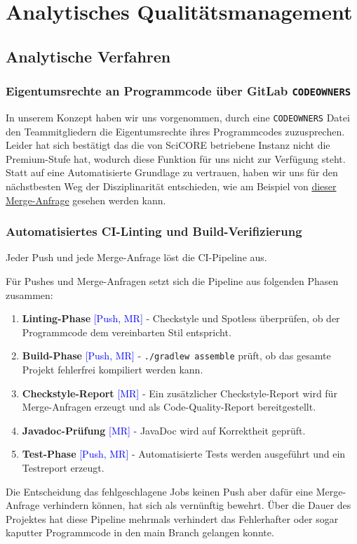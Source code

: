 \documentclass{article}
\begin{document}
\newpage
\section{Analytisches Qualitätsmanagement}

\subsection{Analytische Verfahren}

\subsubsection{Eigentumsrechte an Programmcode über GitLab \texttt{CODEOWNERS}}
In unserem Konzept haben wir uns vorgenommen, durch eine \texttt{CODEOWNERS} Datei den Teammitgliedern die Eigentumsrechte ihres Programmcodes zuzusprechen. Leider hat sich bestätigt das die von SciCORE betriebene Instanz nicht die Premium-Stufe hat, wodurch diese Funktion für uns nicht zur Verfügung steht. \\

Statt auf eine Automatisierte Grundlage zu vertrauen, haben wir uns für den nächstbesten Weg der Disziplinarität entschieden, wie am Beispiel von \href{https://git.scicore.unibas.ch/cs108-fs26/Gruppe-13/-/merge_requests/166}{dieser Merge-Anfrage} gesehen werden kann.

\subsubsection{Automatisiertes CI-Linting und Build-Verifizierung}
Jeder Push und jede Merge-Anfrage löst die CI-Pipeline aus.

Für Pushes und Merge-Anfragen setzt sich die Pipeline aus folgenden Phasen zusammen:
\begin{enumerate}
  \item \textbf{Linting-Phase} \textcolor{blue}{[Push, MR]} - Checkstyle und Spotless überprüfen, ob der Programmcode dem vereinbarten Stil entspricht.
  \item \textbf{Build-Phase} \textcolor{blue}{[Push, MR]} - \texttt{./gradlew assemble} prüft, ob das gesamte Projekt fehlerfrei kompiliert werden kann.
  \item \textbf{Checkstyle-Report} \textcolor{blue}{[MR]} - Ein zusätzlicher Checkstyle-Report wird für Merge-Anfragen erzeugt und als Code-Quality-Report bereitgestellt.
  \item \textbf{Javadoc-Prüfung} \textcolor{blue}{[MR]} - JavaDoc wird auf Korrektheit geprüft.
  \item \textbf{Test-Phase} \textcolor{blue}{[Push, MR]} - Automatisierte Tests werden ausgeführt und ein Testreport erzeugt.
\end{enumerate}
Die Entscheidung das fehlgeschlagene Jobs keinen Push aber dafür eine Merge-Anfrage verhindern können, hat sich als vernünftig bewehrt.
Über die Dauer des Projektes hat diese Pipeline mehrmals verhindert das Fehlerhafter oder sogar kaputter Programmcode in den main Branch gelangen konnte.
\end{document}
